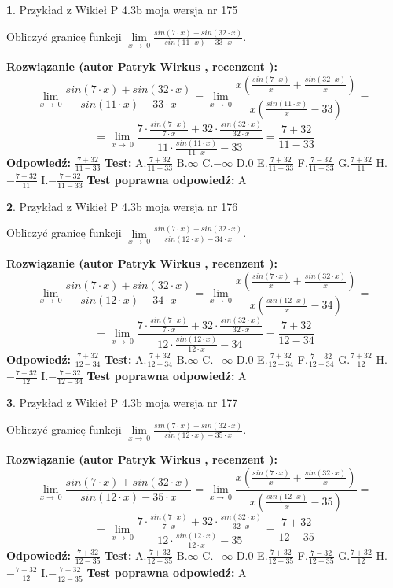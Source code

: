 \documentclass[12pt, a4paper]{article}
\theoremstyle{definition} %
\newtheorem{zad}{}
\newcommand{\zadStart}[1]{\begin{zad}#1\newline}
\newcommand{\zadStop}{\end{zad}}
\newcommand{\rozwStart}[2]{\noindent \textbf{Rozwiązanie (autor #1 , recenzent #2): }\newline}
\newcommand{\rozwStop}{\newline}
\newcommand{\odpStart}{\noindent \textbf{Odpowiedź:}\newline}
\newcommand{\odpStop}{\newline}
\newcommand{\testStart}{\noindent \textbf{Test:}\newline}
\newcommand{\testStop}{\newline}
\newcommand{\kluczStart}{\noindent \textbf{Test poprawna odpowiedź:}\newline}
\newcommand{\kluczStop}{\newline}
\begin{document}
\zadStart{Przykład z Wikieł P 4.3b moja wersja nr 175}


Obliczyć granicę funkcji $\lim\limits_{x\to\ 0}\frac{sin(7 \cdot x)+sin(32 \cdot x)}{sin(11 \cdot x)-33 \cdot x}$.
\zadStop
\rozwStart{Patryk Wirkus}{}
$$\lim\limits_{x\to\ 0}\frac{sin(7 \cdot x)+sin(32 \cdot x)}{sin(11 \cdot x)-33 \cdot x}=\lim\limits_{x\to\ 0}\frac{x(\frac{sin(7 \cdot x)}{x}+\frac{sin(32 \cdot x)}{x})}{x(\frac{sin(11 \cdot x)}{x}-33)}=$$
$$=\lim\limits_{x\to\ 0}\frac{7 \cdot \frac{sin(7 \cdot x)}{7 \cdot x}+32 \cdot \frac{sin(32 \cdot x)}{32 \cdot x}}{11 \cdot \frac{sin(11 \cdot x)}{11 \cdot x}-33}=\frac{7+32}{11-33}$$
\rozwStop
\odpStart
$\frac{7+32}{11-33}$
\odpStop
\testStart
A.$\frac{7+32}{11-33}$
B.$\infty$
C.$-\infty$
D.$0$
E.$\frac{7+32}{11+33}$
F.$\frac{7-32}{11-33}$
G.$\frac{7+32}{11}$
H.$-\frac{7+32}{11}$
I.$-\frac{7+32}{11-33}$
\testStop
\kluczStart
A
\kluczStop



\zadStart{Przykład z Wikieł P 4.3b moja wersja nr 176}


Obliczyć granicę funkcji $\lim\limits_{x\to\ 0}\frac{sin(7 \cdot x)+sin(32 \cdot x)}{sin(12 \cdot x)-34 \cdot x}$.
\zadStop
\rozwStart{Patryk Wirkus}{}
$$\lim\limits_{x\to\ 0}\frac{sin(7 \cdot x)+sin(32 \cdot x)}{sin(12 \cdot x)-34 \cdot x}=\lim\limits_{x\to\ 0}\frac{x(\frac{sin(7 \cdot x)}{x}+\frac{sin(32 \cdot x)}{x})}{x(\frac{sin(12 \cdot x)}{x}-34)}=$$
$$=\lim\limits_{x\to\ 0}\frac{7 \cdot \frac{sin(7 \cdot x)}{7 \cdot x}+32 \cdot \frac{sin(32 \cdot x)}{32 \cdot x}}{12 \cdot \frac{sin(12 \cdot x)}{12 \cdot x}-34}=\frac{7+32}{12-34}$$
\rozwStop
\odpStart
$\frac{7+32}{12-34}$
\odpStop
\testStart
A.$\frac{7+32}{12-34}$
B.$\infty$
C.$-\infty$
D.$0$
E.$\frac{7+32}{12+34}$
F.$\frac{7-32}{12-34}$
G.$\frac{7+32}{12}$
H.$-\frac{7+32}{12}$
I.$-\frac{7+32}{12-34}$
\testStop
\kluczStart
A
\kluczStop



\zadStart{Przykład z Wikieł P 4.3b moja wersja nr 177}


Obliczyć granicę funkcji $\lim\limits_{x\to\ 0}\frac{sin(7 \cdot x)+sin(32 \cdot x)}{sin(12 \cdot x)-35 \cdot x}$.
\zadStop
\rozwStart{Patryk Wirkus}{}
$$\lim\limits_{x\to\ 0}\frac{sin(7 \cdot x)+sin(32 \cdot x)}{sin(12 \cdot x)-35 \cdot x}=\lim\limits_{x\to\ 0}\frac{x(\frac{sin(7 \cdot x)}{x}+\frac{sin(32 \cdot x)}{x})}{x(\frac{sin(12 \cdot x)}{x}-35)}=$$
$$=\lim\limits_{x\to\ 0}\frac{7 \cdot \frac{sin(7 \cdot x)}{7 \cdot x}+32 \cdot \frac{sin(32 \cdot x)}{32 \cdot x}}{12 \cdot \frac{sin(12 \cdot x)}{12 \cdot x}-35}=\frac{7+32}{12-35}$$
\rozwStop
\odpStart
$\frac{7+32}{12-35}$
\odpStop
\testStart
A.$\frac{7+32}{12-35}$
B.$\infty$
C.$-\infty$
D.$0$
E.$\frac{7+32}{12+35}$
F.$\frac{7-32}{12-35}$
G.$\frac{7+32}{12}$
H.$-\frac{7+32}{12}$
I.$-\frac{7+32}{12-35}$
\testStop
\kluczStart
A
\kluczStop
\end{document}
